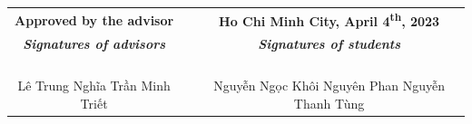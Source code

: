 \documentclass{article}[14pt]
\begin{document}
\begin{table}[h]
    \begin{tabular}{p{} p{} p{}}
    \multicolumn{1}{c}{\textbf{Approved by the advisor}} & & \multicolumn{1}{c}{\textbf{Ho Chi Minh City, April 4\textsuperscript{th}, 2023}}       \\
    \multicolumn{1}{c}{\textit{\textbf{Signatures of advisors}}} & & \multicolumn{1}{c}{\textit{\textbf{Signatures of students}}} \\ & & \\ & & \\ & & \\ & & \\ 
    \multicolumn{1}{c}{Lê Trung Nghĩa \: Trần Minh Triết} & & \multicolumn{1}{c}{\: Nguyễn Ngọc Khôi Nguyên \: Phan Nguyễn Thanh Tùng}      
    \end{tabular}
\end{table}
    
\end{document}
